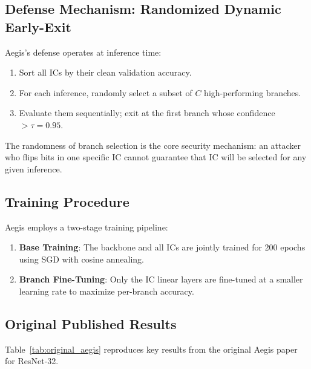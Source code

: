 \documentclass[12pt,a4paper]{article}
\newcommand{\ic}{\textsc{IC}}
\begin{document}
\subsection{Defense Mechanism: Randomized Dynamic Early-Exit}

Aegis's defense operates at inference time:
\begin{enumerate}
    \item Sort all \ic{}s by their clean validation accuracy.
    \item For each inference, randomly select a subset of $C$ high-performing branches.
    \item Evaluate them sequentially; exit at the first branch whose confidence $> \tau = 0.95$.
\end{enumerate}

The randomness of branch selection is the core security mechanism: an attacker who flips bits in one specific \ic{} cannot guarantee that \ic{} will be selected for any given inference.

\subsection{Training Procedure}

Aegis employs a two-stage training pipeline:
\begin{enumerate}
    \item \textbf{Base Training}: The backbone and all \ic{}s are jointly trained for 200 epochs using SGD with cosine annealing.
    \item \textbf{Branch Fine-Tuning}: Only the \ic{} linear layers are fine-tuned at a smaller learning rate to maximize per-branch accuracy.
\end{enumerate}

\subsection{Original Published Results}

Table~\ref{tab:original_aegis} reproduces key results from the original Aegis paper~\cite{aegis} for ResNet-32.
\end{document}
